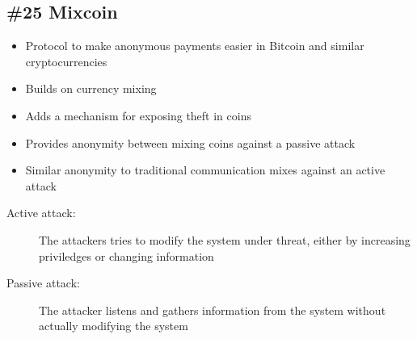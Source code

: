 \subsection*{\#25 Mixcoin}
\begin{itemize}
	\item Protocol to make anonymous payments easier in Bitcoin and similar cryptocurrencies
	\item Builds on currency mixing
	\item Adds a mechanism for exposing theft in coins
	\item Provides anonymity between mixing coins against a passive attack
	\item Similar anonymity to traditional communication mixes against an active attack
\end{itemize}
\begin{description}
	\item[Active attack:] The attackers tries to modify the system under threat, either by increasing priviledges or changing information
	\item[Passive attack:] The attacker listens and gathers information from the system without actually modifying the system
\end{description}